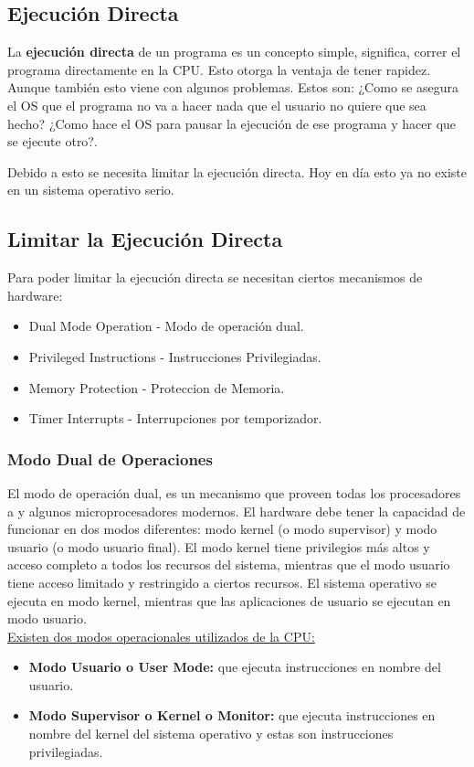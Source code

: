 \documentclass[../main.tex]{subfiles}
\begin{document}
    \subsection{Ejecución Directa}
        La \textbf{ejecución directa} de un programa es un concepto simple, significa, correr el programa directamente en la CPU. Esto otorga la ventaja de tener rapidez. Aunque también esto viene con algunos problemas. Estos son: ¿Como se asegura el OS que el programa no va a hacer nada que el usuario no quiere que sea hecho? ¿Como hace el OS para pausar la ejecución de ese programa y hacer que se ejecute otro?.

        Debido a esto se necesita limitar la ejecución directa. Hoy en día esto ya no existe en un sistema operativo serio.
	
    \subsection{Limitar la Ejecución Directa}
        Para poder limitar la ejecución directa se necesitan ciertos mecanismos de hardware:
        \begin{itemize}
            \item Dual Mode Operation - Modo de operación dual.
            \item Privileged Instructions - Instrucciones Privilegiadas.
            \item Memory Protection - Proteccion de Memoria.
            \item Timer Interrupts - Interrupciones por temporizador.
        \end{itemize}
        
        \subsubsection*{Modo Dual de Operaciones}
            El modo de operación dual, es un mecanismo que proveen todas los procesadores a y algunos microprocesadores modernos. El hardware debe tener la capacidad de funcionar en dos modos diferentes: modo kernel (o modo supervisor) y modo usuario (o modo usuario final). El modo kernel tiene privilegios más altos y acceso completo a todos los recursos del sistema, mientras que el modo usuario tiene acceso limitado y restringido a ciertos recursos. El sistema operativo se ejecuta en modo kernel, mientras que las aplicaciones de usuario se ejecutan en modo usuario.\\

            \underline{Existen dos modos operacionales utilizados de la CPU:}
            \begin{itemize}
                \item \textbf{Modo Usuario o User Mode:} que ejecuta instrucciones en nombre del usuario.
                \item \textbf{Modo Supervisor o Kernel o Monitor:} que ejecuta instrucciones en nombre del kernel del sistema operativo y estas son instrucciones privilegiadas.
            \end{itemize}
    
\end{document}
